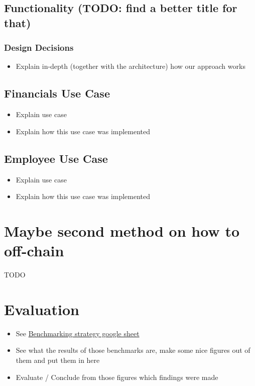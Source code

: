 \documentclass[a4paper]{article}
\begin{document}
\subsection{Functionality (TODO: find a better title for that)}

\subsubsection{Design Decisions}
\begin{itemize}
\item Explain in-depth (together with the architecture) how our approach works
\end{itemize}


\subsection{Financials Use Case}
\begin{itemize}
\item Explain use case
\item Explain how this use case was implemented
\end{itemize}

\subsection{Employee Use Case}
\begin{itemize}
\item Explain use case
\item Explain how this use case was implemented
\end{itemize}


\section{Maybe second method on how to off-chain}
TODO

\section{Evaluation}
\begin{itemize}
\item See \href{https://drive.google.com/drive/folders/1KhEb6TT2YXKUlSJx2sdfR44ZhWUSHnXN}{Benchmarking strategy google sheet}
\item See what the results of those benchmarks are, make some nice figures out of them and put them in here
\item Evaluate / Conclude from those figures which findings were made
\end{itemize}
\end{document}
